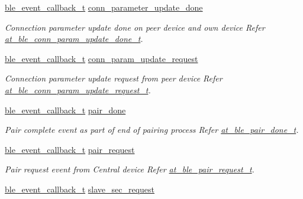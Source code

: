 \begin{DoxyCompactItemize}
\mbox{\hyperlink{ble__manager_8h_a04ce4bb8cb8282f2762e3924b1773cc9}{ble\+\_\+event\+\_\+callback\+\_\+t}} \mbox{\hyperlink{structble__gap__event__cb_a188c92b6f13d3c1043589b27e7be9c73}{conn\+\_\+parameter\+\_\+update\+\_\+done}}
\begin{DoxyCompactList}\small\item\em Connection parameter update done on peer device and own device Refer \mbox{\hyperlink{structat__ble__conn__param__update__done__t}{at\+\_\+ble\+\_\+conn\+\_\+param\+\_\+update\+\_\+done\+\_\+t}}. \end{DoxyCompactList}\item 
\mbox{\hyperlink{ble__manager_8h_a04ce4bb8cb8282f2762e3924b1773cc9}{ble\+\_\+event\+\_\+callback\+\_\+t}} \mbox{\hyperlink{structble__gap__event__cb_ab6bf3bb7fc558c70dba3e1f8b8905b8f}{conn\+\_\+param\+\_\+update\+\_\+request}}
\begin{DoxyCompactList}\small\item\em Connection parameter update request from peer device Refer \mbox{\hyperlink{structat__ble__conn__param__update__request__t}{at\+\_\+ble\+\_\+conn\+\_\+param\+\_\+update\+\_\+request\+\_\+t}}. \end{DoxyCompactList}\item 
\mbox{\hyperlink{ble__manager_8h_a04ce4bb8cb8282f2762e3924b1773cc9}{ble\+\_\+event\+\_\+callback\+\_\+t}} \mbox{\hyperlink{structble__gap__event__cb_a1c49b2a5f5d3615b3bbc5c2d9150cf0d}{pair\+\_\+done}}
\begin{DoxyCompactList}\small\item\em Pair complete event as part of end of pairing process Refer \mbox{\hyperlink{structat__ble__pair__done__t}{at\+\_\+ble\+\_\+pair\+\_\+done\+\_\+t}}. \end{DoxyCompactList}\item 
\mbox{\hyperlink{ble__manager_8h_a04ce4bb8cb8282f2762e3924b1773cc9}{ble\+\_\+event\+\_\+callback\+\_\+t}} \mbox{\hyperlink{structble__gap__event__cb_a2319946e714518f71853159f0c7a7d06}{pair\+\_\+request}}
\begin{DoxyCompactList}\small\item\em Pair request event from Central device Refer \mbox{\hyperlink{structat__ble__pair__request__t}{at\+\_\+ble\+\_\+pair\+\_\+request\+\_\+t}}. \end{DoxyCompactList}\item 
\mbox{\hyperlink{ble__manager_8h_a04ce4bb8cb8282f2762e3924b1773cc9}{ble\+\_\+event\+\_\+callback\+\_\+t}} \mbox{\hyperlink{structble__gap__event__cb_a13f404377a9ffdd95fc8903626dbf4a2}{slave\+\_\+sec\+\_\+request}}

\end{DoxyCompactItemize}
